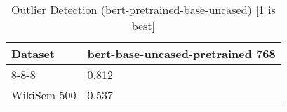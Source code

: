 \begin{table}[]
\centering
\begin{tabular}{l|l}
\hline
Dataset & bert-base-uncased-pretrained 768 \\
\hline
8-8-8 & 0.812 \\ 
WikiSem-500 & 0.537
\end{tabular}
\caption{Outlier Detection (bert-pretrained-base-uncased) [1 is best]}
\label{tab:outlier-bert-pretrained-base-uncased}
\end{table}
